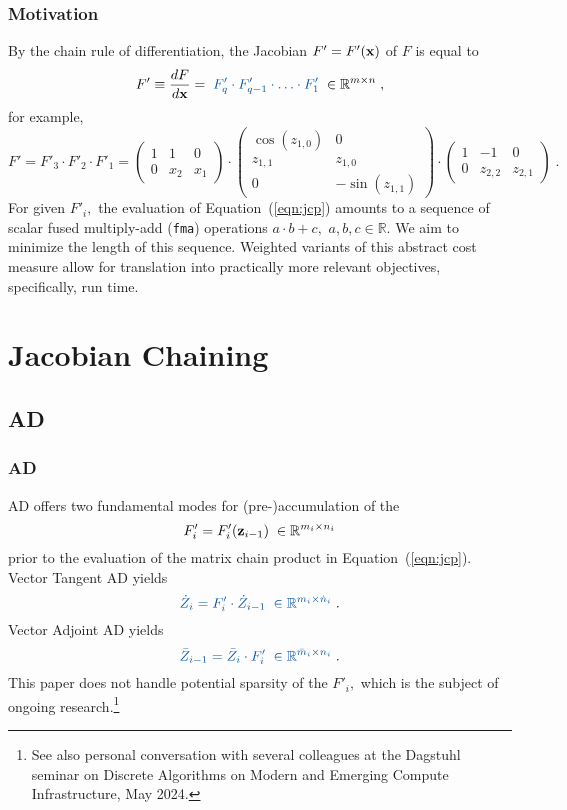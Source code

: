 \documentclass[ucs,10pt]{beamer}
\newcommand{\X}{{\bf x}}
\newcommand{\Z}{{\bf z}}
\newcommand{\R}{{\mathbb{R}}}
\newcommand{\fma}{{\small {\tt fma}}}
\begin{document}
\begin{frame}
\frametitle{Motivation}
\vfill
\vfill
By the chain rule of differentiation, the Jacobian $F'=F'(\X)$ of $F$ is
equal to
\vfill
\begin{equation} \label{eqn:jcp}
	F' \equiv \frac{d F}{d \X}= \; \textcolor{rwth-blue}{F'_q \cdot F'_{q-1} \cdot \ldots \cdot F'_1} \;  \in \R^{m \times n} \; ,
\end{equation}
for example, 
	{\small
		$$
		F'=F'_3 \cdot F'_2 \cdot F'_1 =
		\begin{pmatrix}
			1 & 1 & 0 \\
			0& x_2 & x_1 
		\end{pmatrix} \cdot
		\begin{pmatrix}
			\cos(z_{1,0}) & 0 \\
			z_{1,1} & z_{1,0} \\
			0 & -\sin(z_{1,1}) 
		\end{pmatrix} \cdot
		\begin{pmatrix}
			1 & -1 & 0 \\
			0 & z_{2,2} & z_{2,1}
		\end{pmatrix} \; .
		$$
		}
\vfill
For given $F'_i,$ the 
evaluation of Equation~(\ref{eqn:jcp}) amounts to a sequence of
scalar fused multiply-add (\fma) operations $a \cdot b + c,$ $a,b,c \in \R.$
\vfill
We aim to minimize the length of this sequence.
\vfill
Weighted variants of this
abstract cost measure allow for translation into practically more relevant
objectives, specifically, run time.
		\vfill
		\vfill
\end{frame}


\section{Jacobian Chaining}

\subsection{AD}

\begin{frame}
\frametitle{AD}
\vfill
\vfill
	AD \cite{Griewank2008EDP} offers two fundamental modes for (pre-)accumulation
of the 
$$F'_i = F'_i(\Z_{i-1}) \; \in \R^{m_i \times n_i}$$ prior to the evaluation 
of the matrix chain product in Equation~(\ref{eqn:jcp}).
\vfill
Vector Tangent AD yields
\begin{equation} \label{eqn:st}
	\textcolor{rwth-blue}{
		\dot{Z}_i=F'_i \cdot \dot{Z}_{i-1} \; \in \R^{m_i \times \dot{n}_i} }\; .
\end{equation}
\vfill
Vector Adjoint AD yields
\begin{equation} \label{eqn:sa}
	\textcolor{rwth-blue}{
		\bar{Z}_{i-1}= \bar{Z}_i \cdot F'_i \; \in \R^{\bar{m}_i \times n_i}} \; .
\end{equation}
\vfill
This paper does not handle potential sparsity of the $F'_i,$ 
	which is the subject of ongoing research.\footnote{See also personal conversation with several colleagues at the Dagstuhl seminar on Discrete Algorithms on Modern and Emerging Compute Infrastructure, May 2024.}
\vfill
\vfill
\end{frame}
\end{document}
